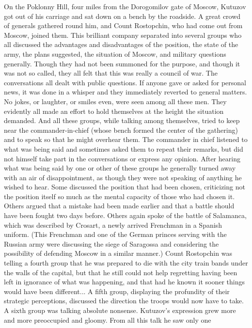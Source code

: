 On the Poklonny Hill, four miles from the Dorogomilov gate of
Moscow, Kutuzov got out of his carriage and sat down on a bench
by the roadside.  A great crowd of generals gathered round him,
and Count Rostopchin, who had come out from Moscow, joined
them. This brilliant company separated into several groups who
all discussed the advantages and disadvantages of the position,
the state of the army, the plans suggested, the situation of
Moscow, and military questions generally. Though they had not
been summoned for the purpose, and though it was not so called,
they all felt that this was really a council of war. The
conversations all dealt with public questions. If anyone gave or
asked for personal news, it was done in a whisper and they
immediately reverted to general matters. No jokes, or laughter,
or smiles even, were seen among all these men. They evidently all
made an effort to hold themselves at the height the situation
demanded. And all these groups, while talking among themselves,
tried to keep near the commander-in-chief (whose bench formed the
center of the gathering) and to speak so that he might overhear
them. The commander in chief listened to what was being said and
sometimes asked them to repeat their remarks, but did not himself
take part in the conversations or express any opinion. After
hearing what was being said by one or other of these groups he
generally turned away with an air of disappointment, as though
they were not speaking of anything he wished to hear. Some
discussed the position that had been chosen, criticizing not the
position itself so much as the mental capacity of those who had
chosen it. Others argued that a mistake had been made earlier and
that a battle should have been fought two days before. Others
again spoke of the battle of Salamanca, which was described by
Crosart, a newly arrived Frenchman in a Spanish uniform.  (This
Frenchman and one of the German princes serving with the Russian
army were discussing the siege of Saragossa and considering the
possibility of defending Moscow in a similar manner.) Count
Rostopchin was telling a fourth group that he was prepared to die
with the city train bands under the walls of the capital, but
that he still could not help regretting having been left in
ignorance of what was happening, and that had he known it sooner
things would have been different... A fifth group, displaying the
profundity of their strategic perceptions, discussed the
direction the troops would now have to take. A sixth group was
talking absolute nonsense. Kutuzov's expression grew more and
more preoccupied and gloomy. From all this talk he saw only one
